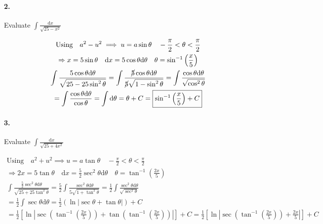     \paragraph*{2.}
    Evaluate $\int\frac{\mathrm{d}x}{\sqrt{25-x^2}}$

    \begin{mdframed}
        \begin{equation*}
            \begin{gathered}
                \text{Using} \quad a^2 - u^2 \implies u = a\sin\theta \quad -\frac{\pi}{2} < \theta < \frac{\pi}{2}  \\
                \Rightarrow x = 5\sin\theta \quad \mathrm{d}x = 5\cos\theta\mathrm{d}\theta \quad \theta = \sin^{-1}\left(\frac{x}{5}\right)    \\
                \int\frac{5\cos\theta\mathrm{d}\theta}{\sqrt{25-25\sin^{2}\theta}} = \int\frac{\cancel{5}\cos\theta\mathrm{d}\theta}{\cancel{5}\sqrt{1-\sin^{2}\theta}} = \int\frac{\cos\theta\mathrm{d}\theta}{\sqrt{\cos^{2}\theta}}  \\
                = \int\frac{\cos\theta\mathrm{d}\theta}{\cos\theta} = \int\mathrm{d}\theta = \theta + C = \boxed{\sin^{-1}\left(\frac{x}{5}\right) + C}
            \end{gathered}
        \end{equation*}
    \end{mdframed}

    \paragraph*{3.}
    Evaluate $\int\frac{\mathrm{d}x}{\sqrt{25+4x^2}}$

    \begin{mdframed}
        \begin{equation*}
            \begin{gathered}
                \text{Using} \quad a^2 + u^2 \implies u = a\tan\theta \quad -\frac{\pi}{2} < \theta < \frac{\pi}{2}  \\
                \Rightarrow 2x = 5\tan\theta \quad \mathrm{d}x = \frac{5}{2}\sec^{2}\theta\mathrm{d}\theta \quad \theta = \tan^{-1}\left(\frac{2x}{5}\right)    \\
                \int\frac{\frac{5}{2}\sec^{2}\theta\mathrm{d}\theta}{\sqrt{25+25\tan^{2}\theta}} = \frac{5}{2}\int\frac{\sec^{2}\theta\mathrm{d}\theta}{5\sqrt{1+\tan^{2}\theta}} =  \frac{1}{2}\int\frac{\sec^{2}\theta\mathrm{d}\theta}{\sqrt{\sec^{2}\theta}}    \\
                = \frac{1}{2}\int\sec\theta\mathrm{d}\theta = \frac{1}{2}(\ln|\sec\theta+\tan\theta|) + C   \\
                = \frac{1}{2}\left[\ln\left|\sec\left(\tan^{-1}\left(\frac{2x}{5}\right)\right) + \tan\left(\tan^{-1}\left(\frac{2x}{5}\right)\right)\right|\right] + C = \boxed{\frac{1}{2}\left[\ln\left|\sec\left(\tan^{-1}\left(\frac{2x}{5}\right)\right) + \frac{2x}{5}\right|\right] + C}
            \end{gathered}
        \end{equation*}
    \end{mdframed}

